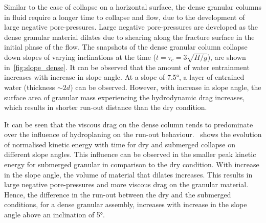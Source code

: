 Similar to the case of collapse on a horizontal surface, the dense granular 
columns in fluid require a longer time to collapse and flow, due to the 
development of large negative pore-pressures. Large negative pore-pressures are 
developed as the dense granular material dilates due to shearing along the 
fracture surface in the initial phase of the flow. The snapshots of the dense 
granular column collapse down slopes of varying inclinations at the time 
($t=\tau_{c}=3\sqrt{H/g}$), are shown in~\cref{fig:slope_dense}. It can be 
observed that the amount of water entrainment increases with increase in slope 
angle. At a slope of 7.5\si{\degree}, a layer of entrained water (thickness 
$\sim 2d$) can be observed. However, with increase in slope angle, the surface 
area of granular mass experiencing the hydrodynamic drag increases, which 
results in shorter run-out distance than the dry condition.

It can be seen that the viscous drag on the dense column tends to predominate 
over the influence of hydroplaning on the run-out 
behaviour.~ shows the evolution of normalised kinetic energy 
with time for dry and submerged collapse on different slope angles. This 
influence can be observed in the smaller peak kinetic energy for submerged 
granular in comparison to the dry condition. With increase in 
the slope angle, the volume of material that dilates increases. This results in 
large negative pore-pressures and more viscous drag on the granular material. 
Hence, the difference in the run-out between the dry and the submerged 
conditions, for a dense granular assembly, increases with increase in the slope 
angle above an inclination of 5\si{\degree}.


